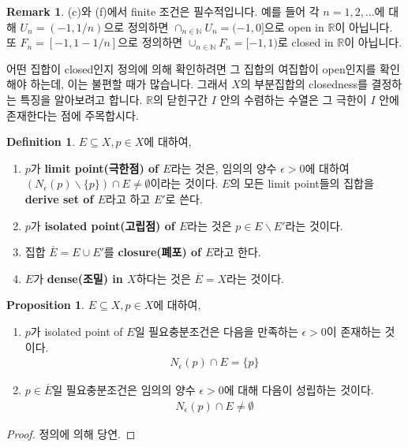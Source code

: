 \documentclass[12pt]{article}
\theoremstyle{definition}
\newtheorem{prop}[thm]{Proposition}
\newtheorem{defn}[thm]{Definition}
\newtheorem*{rem}{Remark}
\def\NN{\mathbb{N}}
\def\RR{\mathbb{R}}
\def\eps{\epsilon}
\begin{document}
	\begin{rem}
		(c)와 (f)에서 finite 조건은 필수적입니다. 예를 들어 각 \(n=1, 2, ...\)에 대해 \(U_n = (-1, 1/n)\)으로 정의하면 \(\cap_{n \in \NN} U_n = (-1, 0]\)으로 open in \(\mathbb{R}\)이 아닙니다. 또 \(F_n = [-1, 1-1/n]\)으로 정의하면 \(\cup_{n \in \NN} F_n = [-1, 1)\)로 closed in \(\mathbb{R}\)이 아닙니다.
	\end{rem}


어떤 집합이 closed인지 정의에 의해 확인하려면 그 집합의 여집합이 open인지를 확인해야 하는데, 이는 불편할 때가 많습니다. 그래서 \(X\)의 부분집합의 closedness를 결정하는 특징을 알아보려고 합니다. \(\RR\)의 닫힌구간 \(I\) 안의 수렴하는 수열은 그 극한이 \(I\) 안에 존재한다는 점에 주목합시다.

	\begin{defn}
		\(E \subseteq X, p \in X\)에 대하여,
		\begin{enumerate}[label=(\alph*), leftmargin=2\parindent]
			\item
			\(p\)가 \textbf{limit point(극한점) of \(E\)}라는 것은, 임의의 양수 \(\eps > 0\)에 대하여 \((N_\eps (p) \backslash \{p\}) \cap E \neq \emptyset\)이라는 것이다. \(E\)의 모든 limit point들의 집합을 \textbf{derive set of \(E\)}라고 하고 \(E'\)로 쓴다.
			\item
			\(p\)가 \textbf{isolated point(고립점) of \(E\)}라는 것은 \(p \in E \backslash E'\)라는 것이다.
			\item
			집합 \(\overline{E} = E \cup E'\)를 \textbf{closure(폐포) of \(E\)}라고 한다.
			\item
			\(E\)가 \textbf{dense(조밀) in \(X\)}하다는 것은 \(\overline{E} = X\)라는 것이다.
		\end{enumerate}
	\end{defn}

	\begin{prop}
		\(E \subseteq X, p \in X\)에 대하여,
		\begin{enumerate}[label=(\alph*), leftmargin=2\parindent]
			\item
			\(p\)가 isolated point of \(E\)일 필요충분조건은 다음을 만족하는 \(\eps > 0\)이 존재하는 것이다.
			\begin{gather*}
				N_\eps(p) \cap E = \{p\}
			\end{gather*}
			\item
			\(p \in \overline{E}\)일 필요충분조건은 임의의 양수 \(\eps > 0\)에 대해 다음이 성립하는 것이다.
			\begin{gather*}
				N_\eps (p) \cap E \neq \emptyset
			\end{gather*}
		\end{enumerate}
	\end{prop}
	\begin{proof}
		정의에 의해 당연.
	\end{proof}
\end{document}
